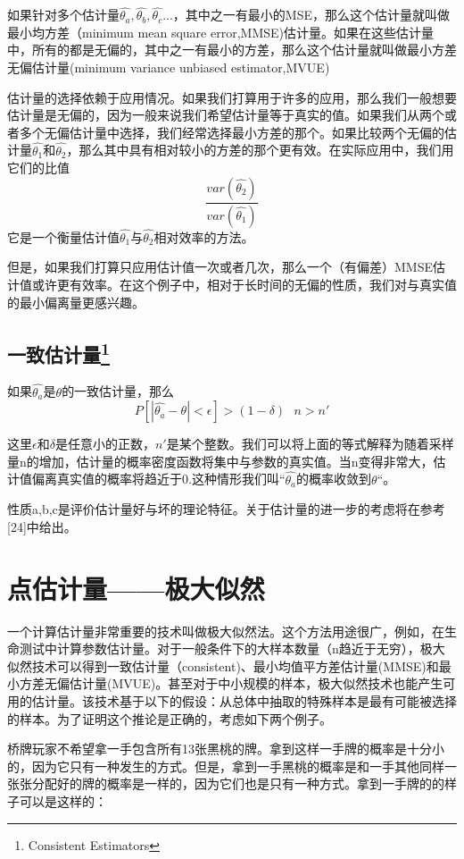 \documentclass[cn,11pt,chinese]{elegantbook}
\begin{document}
{如果针对多个估计量$\hat{\theta_a},\hat{\theta_b},\hat{\theta_c}$...，其中之一有最小的MSE，那么这个估计量就叫做最小均方差（minimum mean square error,MMSE)估计量。如果在这些估计量中，所有的都是无偏的，其中之一有最小的方差，那么这个估计量就叫做最小方差无偏估计量(minimum variance unbiased estimator,MVUE)

估计量的选择依赖于应用情况。如果我们打算用于许多的应用，那么我们一般想要估计量是无偏的，因为一般来说我们希望估计量等于真实的值。如果我们从两个或者多个无偏估计量中选择，我们经常选择最小方差的那个。如果比较两个无偏的估计量$\hat{\theta_1}$和$\hat{\theta_2}$，那么其中具有相对较小的方差的那个更有效。在实际应用中，我们用它们的比值
$$\frac{var(\hat{\theta_2})}{var(\hat{\theta_1})}$$
它是一个衡量估计值$\hat{\theta_1}$与$\hat{\theta_2}$相对效率的方法。

但是，如果我们打算只应用估计值一次或者几次，那么一个（有偏差）MMSE估计值或许更有效率。在这个例子中，相对于长时间的无偏的性质，我们对与真实值的最小偏离量更感兴趣。

\subsection{一致估计量\footnote{Consistent Estimators}}

如果$\hat{\theta_a}$是$\theta$的一致估计量，那么
$$P[|\hat{\theta_a} - \theta | < \epsilon] > (1-\delta) \ \ \ n>n'$$

这里$\epsilon$和$\delta$是任意小的正数，$n'$是某个整数。我们可以将上面的等式解释为随着采样量n的增加，估计量的概率密度函数将集中与参数的真实值。当n变得非常大，估计值偏离真实值的概率将趋近于0.这种情形我们叫“$\hat{\theta_a}$的概率收敛到$\theta$“。

性质a,b,c是评价估计量好与坏的理论特征。关于估计量的进一步的考虑将在参考[24]中给出。

\section{点估计量——极大似然}

一个计算估计量非常重要的技术叫做极大似然法。这个方法用途很广，例如，在生命测试中计算参数估计量。对于一般条件下的大样本数量（n趋近于无穷），极大似然技术可以得到一致估计量（consistent)、最小均值平方差估计量(MMSE)和最小方差无偏估计量(MVUE)。甚至对于中小规模的样本，极大似然技术也能产生可用的估计量。该技术基于以下的假设：从总体中抽取的特殊样本是最有可能被选择的样本。为了证明这个推论是正确的，考虑如下两个例子。

桥牌玩家不希望拿一手包含所有13张黑桃的牌。拿到这样一手牌的概率是十分小的，因为它只有一种发生的方式。但是，拿到一手黑桃的概率是和一手其他同样一张张分配好的牌的概率是一样的，因为它们也是只有一种方式。拿到一手牌的的样子可以是这样的：

}
\end{document}
